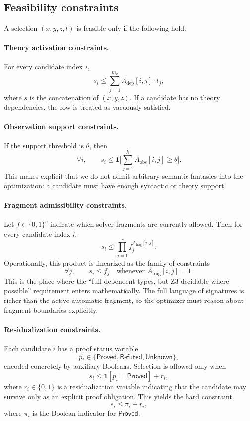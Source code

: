 \documentclass[11pt]{article}
\newcommand{\Proved}{\ensuremath{\mathsf{Proved}}}
\newcommand{\Refuted}{\ensuremath{\mathsf{Refuted}}}
\newcommand{\Unknown}{\ensuremath{\mathsf{Unknown}}}
\theoremstyle{definition}
\theoremstyle{plain}
\begin{document}
\subsection{Feasibility constraints}
A selection $(x,y,z,t)$ is feasible only if the following hold.

\paragraph{Theory activation constraints.}
For every candidate index $i$,
\[
s_i \le \sum_{j=1}^{m_k} A_{\mathrm{dep}}[i,j] \cdot t_j,
\]
where $s$ is the concatenation of $(x,y,z)$. If a candidate has no theory
dependencies, the row is treated as vacuously satisfied.

\paragraph{Observation support constraints.}
If the support threshold is $\theta$, then
\[
\forall i, \qquad s_i \le \mathbf{1}\Big[\sum_{j=1}^{h} A_{\mathrm{obs}}[i,j] \ge \theta\Big].
\]
This makes explicit that we do not admit arbitrary semantic fantasies into the
optimization: a candidate must have enough syntactic or theory support.

\paragraph{Fragment admissibility constraints.}
Let $f \in \{0,1\}^c$ indicate which solver fragments are currently allowed.
Then for every candidate index $i$,
\[
s_i \le \prod_{j=1}^{c} f_j^{A_{\mathrm{frag}}[i,j]}.
\]
Operationally, this product is linearized as the family of constraints
\[
\forall j, \qquad s_i \le f_j \quad \text{whenever } A_{\mathrm{frag}}[i,j] = 1.
\]
This is the place where the ``full dependent types, but Z3-decidable where
possible'' requirement enters mathematically. The full language of signatures is
richer than the active automatic fragment, so the optimizer must reason about
fragment boundaries explicitly.

\paragraph{Residualization constraints.}
Each candidate $i$ has a proof status variable
\[
p_i \in \{\Proved, \Refuted, \Unknown\},
\]
encoded concretely by auxiliary Booleans. Selection is allowed only when
\[
s_i \le \mathbf{1}[p_i = \Proved] + r_i,
\]
where $r_i \in \{0,1\}$ is a residualization variable indicating that the
candidate may survive only as an explicit proof obligation. This yields the hard
constraint
\[
s_i \le \pi_i + r_i,
\]
where $\pi_i$ is the Boolean indicator for \Proved.
\end{document}
